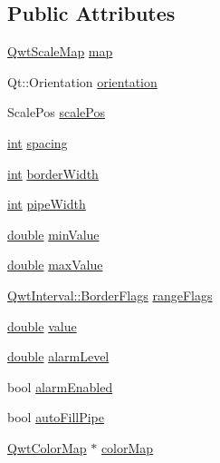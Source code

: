 \subsection*{Public Attributes}
\begin{DoxyCompactItemize}
\item 
\hyperlink{class_qwt_scale_map}{Qwt\-Scale\-Map} \hyperlink{class_qwt_thermo_1_1_private_data_a156edf38173bd2048304cd7b98071d4c}{map}
\item 
Qt\-::\-Orientation \hyperlink{class_qwt_thermo_1_1_private_data_a8bd5ed0ab6d4bca41859db126d8cb97b}{orientation}
\item 
Scale\-Pos \hyperlink{class_qwt_thermo_1_1_private_data_aa6c29e515f61b921c2083c6f1ad5ae50}{scale\-Pos}
\item 
\hyperlink{ioapi_8h_a787fa3cf048117ba7123753c1e74fcd6}{int} \hyperlink{class_qwt_thermo_1_1_private_data_acd7c6225fec7dcba8449af63c9ad5d20}{spacing}
\item 
\hyperlink{ioapi_8h_a787fa3cf048117ba7123753c1e74fcd6}{int} \hyperlink{class_qwt_thermo_1_1_private_data_ac72edba4276e601c5e98dd8438053f1d}{border\-Width}
\item 
\hyperlink{ioapi_8h_a787fa3cf048117ba7123753c1e74fcd6}{int} \hyperlink{class_qwt_thermo_1_1_private_data_ace605b3b65ab961e331735bcb9078774}{pipe\-Width}
\item 
\hyperlink{_super_l_u_support_8h_a8956b2b9f49bf918deed98379d159ca7}{double} \hyperlink{class_qwt_thermo_1_1_private_data_a91c0c5bc4891f432c9f086349ad33489}{min\-Value}
\item 
\hyperlink{_super_l_u_support_8h_a8956b2b9f49bf918deed98379d159ca7}{double} \hyperlink{class_qwt_thermo_1_1_private_data_ad869a6978ba52b734fd6db89f5726edf}{max\-Value}
\item 
\hyperlink{class_qwt_interval_a678a26fcaa91cca596d9aebcbf5776c9}{Qwt\-Interval\-::\-Border\-Flags} \hyperlink{class_qwt_thermo_1_1_private_data_afeec58c8385b9291d91bb01a90548e32}{range\-Flags}
\item 
\hyperlink{_super_l_u_support_8h_a8956b2b9f49bf918deed98379d159ca7}{double} \hyperlink{class_qwt_thermo_1_1_private_data_a3a6caeedc1218f76a908981798367f33}{value}
\item 
\hyperlink{_super_l_u_support_8h_a8956b2b9f49bf918deed98379d159ca7}{double} \hyperlink{class_qwt_thermo_1_1_private_data_ac808fc63218335aba5da0725bf559fef}{alarm\-Level}
\item 
bool \hyperlink{class_qwt_thermo_1_1_private_data_a1f0b338b9a014e608e962e45714c871f}{alarm\-Enabled}
\item 
bool \hyperlink{class_qwt_thermo_1_1_private_data_a375dde5349d6fc28b2e6aadb07049266}{auto\-Fill\-Pipe}
\item 
\hyperlink{class_qwt_color_map}{Qwt\-Color\-Map} $\ast$ \hyperlink{class_qwt_thermo_1_1_private_data_a8d883ae5e828303d9cbcc8ec4eed6d5f}{color\-Map}
\end{DoxyCompactItemize}


